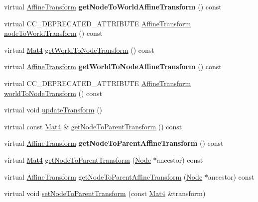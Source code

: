 \begin{Indent}
\begin{DoxyCompactItemize}
\item 
\mbox{\label{classNode_a480466dcf72739dab9d56e0caf8d0f80}} 
virtual \hyperlink{structAffineTransform}{Affine\+Transform} {\bfseries get\+Node\+To\+World\+Affine\+Transform} () const
\item 
virtual C\+C\+\_\+\+D\+E\+P\+R\+E\+C\+A\+T\+E\+D\+\_\+\+A\+T\+T\+R\+I\+B\+U\+TE \hyperlink{structAffineTransform}{Affine\+Transform} \hyperlink{classNode_a26eeb65a02646d8bbe366c9885893a75}{node\+To\+World\+Transform} () const
\item 
virtual \hyperlink{classMat4}{Mat4} \hyperlink{classNode_ab41da5111de6d98710d0497e35063989}{get\+World\+To\+Node\+Transform} () const
\item 
\mbox{\label{classNode_ac7a7fd5d3162ec1b256bed6f9cba1f48}} 
virtual \hyperlink{structAffineTransform}{Affine\+Transform} {\bfseries get\+World\+To\+Node\+Affine\+Transform} () const
\item 
virtual C\+C\+\_\+\+D\+E\+P\+R\+E\+C\+A\+T\+E\+D\+\_\+\+A\+T\+T\+R\+I\+B\+U\+TE \hyperlink{structAffineTransform}{Affine\+Transform} \hyperlink{classNode_a0b6b4ad592891ca7ec7ec0bd09341dd1}{world\+To\+Node\+Transform} () const
\item 
virtual void \hyperlink{classNode_ae570e9d69b67d8f182c076b002fe2d08}{update\+Transform} ()
\item 
virtual const \hyperlink{classMat4}{Mat4} \& \hyperlink{classNode_a58894159c8240ab57a3d62fd6a455c23}{get\+Node\+To\+Parent\+Transform} () const
\item 
\mbox{\label{classNode_aee35f7b32b5a9058686ce70d596ede66}} 
virtual \hyperlink{structAffineTransform}{Affine\+Transform} {\bfseries get\+Node\+To\+Parent\+Affine\+Transform} () const
\item 
virtual \hyperlink{classMat4}{Mat4} \hyperlink{classNode_af403db8a8c516faa4462fd3a87f6eb9a}{get\+Node\+To\+Parent\+Transform} (\hyperlink{classNode}{Node} $\ast$ancestor) const
\item 
virtual \hyperlink{structAffineTransform}{Affine\+Transform} \hyperlink{classNode_a960eb7e75a7c955eba0ba13e51f825ea}{get\+Node\+To\+Parent\+Affine\+Transform} (\hyperlink{classNode}{Node} $\ast$ancestor) const
\item 
virtual void \hyperlink{classNode_a49d96a56bda1b61c829918f771a02a8e}{set\+Node\+To\+Parent\+Transform} (const \hyperlink{classMat4}{Mat4} \&transform)
\item 

\end{DoxyCompactItemize}
\end{Indent}
